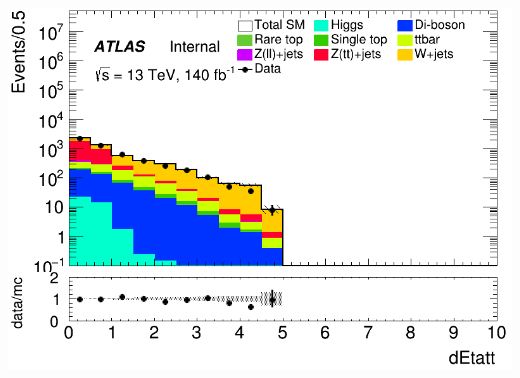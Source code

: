 \documentclass[usenames,dvipsnames]{beamer}
\begin{document}
\begin{frame}
\begin{minipage}{0.32\textwidth}
        \centering
        \includegraphics[width=\textwidth]{graphics/H_met/H_met_dEtatt.png}
    \end{minipage}
    
    \vspace{0.5cm} %

\end{frame}
\end{document}
